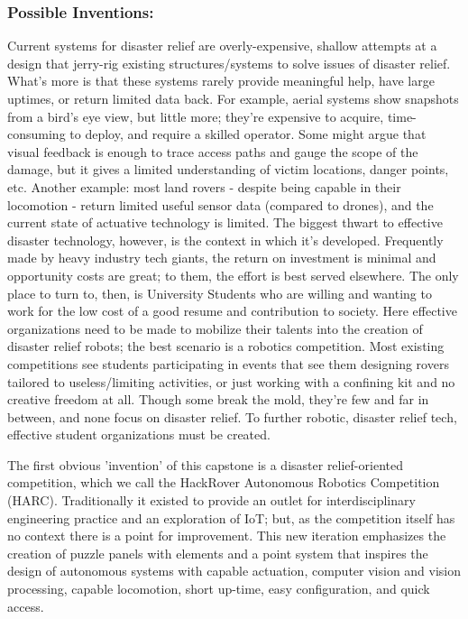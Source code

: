 \documentclass[a4paper, 10pt]{article}
\begin{document}
		\subsubsection*{Possible Inventions:}
		Current systems for disaster relief are overly-expensive, shallow attempts at a design that jerry-rig existing structures/systems to solve issues of disaster relief. What’s more is that these systems rarely provide meaningful help, have large uptimes, or return limited data back. For example, aerial systems show snapshots from a bird's eye view, but little more; they're expensive to acquire, time-consuming to deploy, and require a skilled operator. Some might argue that visual feedback is enough to trace access paths and gauge the scope of the damage, but it gives a limited understanding of victim locations, danger points, etc. Another example: most land rovers - despite being capable in their locomotion - return limited useful sensor data (compared to drones), and the current state of actuative technology is limited. The biggest thwart to effective disaster technology, however, is the context in which it's developed. Frequently made by heavy industry tech giants, the return on investment is minimal and opportunity costs are great; to them, the effort is best served elsewhere. The only place to turn to, then, is University Students who are willing and wanting to work for the low cost of a good resume and contribution to society. Here effective organizations need to be made to mobilize their talents into the creation of disaster relief robots; the best scenario is a robotics competition. Most existing competitions see students participating in events that see them designing rovers tailored to useless/limiting activities, or just working with a confining kit and no creative freedom at all. Though some break the mold, they're few and far in between, and none focus on disaster relief. To further robotic, disaster relief tech, effective student organizations must be created.
		
		The first obvious 'invention' of this capstone is a disaster relief-oriented competition, which we call the HackRover Autonomous Robotics Competition (HARC). Traditionally it existed to provide an outlet for interdisciplinary engineering practice and an exploration of IoT; but, as the competition itself has no context there is a point for improvement. This new iteration emphasizes the creation of puzzle panels with elements and a point system that inspires the design of autonomous systems with capable actuation, computer vision and vision processing, capable locomotion, short up-time, easy configuration, and quick access.
	
\end{document}
